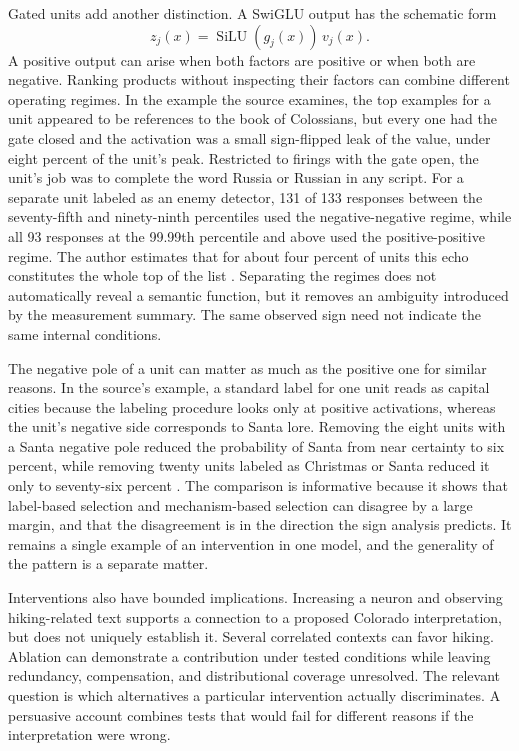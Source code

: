 \documentclass[11pt]{article}
\begin{document}
Gated units add another distinction. A SwiGLU output has the schematic form
\[
 z_j(x)=\operatorname{SiLU}(g_j(x))\,v_j(x).
\]
A positive output can arise when both factors are positive or when both are negative. Ranking products without inspecting their factors can combine different operating regimes. In the example the source examines, the top examples for a unit appeared to be references to the book of Colossians, but every one had the gate closed and the activation was a small sign-flipped leak of the value, under eight percent of the unit's peak. Restricted to firings with the gate open, the unit's job was to complete the word Russia or Russian in any script. For a separate unit labeled as an enemy detector, 131 of 133 responses between the seventy-fifth and ninety-ninth percentiles used the negative-negative regime, while all 93 responses at the 99.99th percentile and above used the positive-positive regime. The author estimates that for about four percent of units this echo constitutes the whole top of the list \cite[\emph{What We Found in Language Models; Separating the Sign Regimes}]{cammarata}. Separating the regimes does not automatically reveal a semantic function, but it removes an ambiguity introduced by the measurement summary. The same observed sign need not indicate the same internal conditions.

The negative pole of a unit can matter as much as the positive one for similar reasons. In the source's example, a standard label for one unit reads as capital cities because the labeling procedure looks only at positive activations, whereas the unit's negative side corresponds to Santa lore. Removing the eight units with a Santa negative pole reduced the probability of Santa from near certainty to six percent, while removing twenty units labeled as Christmas or Santa reduced it only to seventy-six percent \cite[\emph{What We Found in Language Models}]{cammarata}. The comparison is informative because it shows that label-based selection and mechanism-based selection can disagree by a large margin, and that the disagreement is in the direction the sign analysis predicts. It remains a single example of an intervention in one model, and the generality of the pattern is a separate matter.

Interventions also have bounded implications. Increasing a neuron and observing hiking-related text supports a connection to a proposed Colorado interpretation, but does not uniquely establish it. Several correlated contexts can favor hiking. Ablation can demonstrate a contribution under tested conditions while leaving redundancy, compensation, and distributional coverage unresolved. The relevant question is which alternatives a particular intervention actually discriminates. A persuasive account combines tests that would fail for different reasons if the interpretation were wrong.
\end{document}
